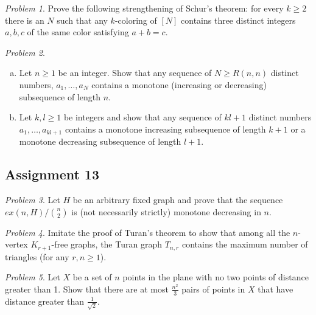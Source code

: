 \documentclass[10pt, fleqn, a4paper, landscape]{article}
\theoremstyle{plain} %
\theoremstyle{remark} %
\newtheorem{problem}{Problem}
\theoremstyle{definition} %
\begin{document}
\begin{multicols}{3}
\begin{tiny}
\begin{problem}
Prove the following strengthening of Schur's theorem: for every $k\ge 2$ there is an $N$ such that any $k$-coloring of $[N]$ contains three distinct integers $a, b, c$ of the same color satisfying $a + b = c.$
\end{problem}

\begin{problem}
\begin{enumerate}[(a)]
\item Let $n\ge 1$ be an integer. Show that any sequence of $N\ge R(n, n)$  distinct numbers, $a_1,\dots, a_N$ contains a monotone (increasing or decreasing) subsequence of length $n$.
\item Let $k, l \ge1$ be integers and show that any sequence of $kl+1$ distinct numbers $a_1,\dots, a_{kl+1}$ contains a monotone increasing subsequence of length $k + 1$ or a monotone decreasing
subsequence of length $l + 1$.
\end{enumerate}
\end{problem}

\subsection{Assignment 13}

\begin{problem}
Let $H$ be an arbitrary fixed graph and prove that the sequence $ex(n,H)/\binom{n}{2}$ is (not necessarily strictly) monotone decreasing in $n$.
\end{problem}

\begin{problem}
Imitate the proof of Turan's theorem to show that among all the $n$-vertex $K_{r+1}$-free graphs, the Turan graph $T_{n,r}$ contains the maximum number of triangles (for any $r, n \ge 1$).
\end{problem}

\begin{problem}
Let $X$ be a set of $n$ points in the plane with no two points of distance greater than 1. Show that there are at most $\frac{n^2}{3}$ pairs of points in $X$ that have distance greater than $\frac{1}{\sqrt{2}}$.
\end{problem}


\end{tiny}
\end{multicols}
\end{document}
